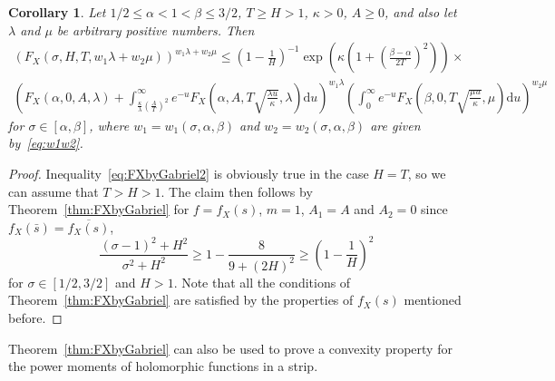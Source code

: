 \documentclass[a4paper,reqno]{amsart}
\newtheorem{corollary}{Corollary}
\theoremstyle{definition}
\newcommand{\dif}[1]{\mathrm{d}#1}
\begin{document}
\begin{corollary}
\label{cor:FXbyGabriel}
Let $1/2\leq \alpha<1<\beta\leq 3/2$, $T\geq H>1$, $\kappa>0$, $A\geq 0$, and also let $\lambda$ and $\mu$ be arbitrary positive numbers. Then
\begin{multline}
\label{eq:FXbyGabriel2}
\left(F_{X}\left(\sigma,H,T,w_{1}\lambda+w_{2}\mu\right)\right)^{w_{1}\lambda+w_{2}\mu} \leq \left(1-\frac{1}{H}\right)^{-1}\exp{\left(\kappa\left(1+\left(\frac{\beta-\alpha}{2T}\right)^{2}\right)\right)} \times \\
\left(F_{X}(\alpha,0,A,\lambda)+\int_{\frac{\kappa}{\lambda}\left(\frac{A}{T}\right)^2}^{\infty}e^{-u}F_{X}\left(\alpha,A,T\sqrt{\frac{\lambda u}{\kappa}},\lambda\right)\dif{u}\right)^{w_1\lambda}\left(\int_{0}^{\infty}e^{-u}F_{X}\left(\beta,0,T\sqrt{\frac{\mu u}{\kappa}},\mu\right)\dif{u}\right)^{w_2\mu}
\end{multline}
for $\sigma\in[\alpha,\beta]$, where $w_1=w_1(\sigma,\alpha,\beta)$ and $w_2=w_2(\sigma,\alpha,\beta)$ are given by~\eqref{eq:w1w2}.
\end{corollary}

\begin{proof}
Inequality~\eqref{eq:FXbyGabriel2} is obviously true in the case $H=T$, so we can assume that $T>H>1$. The claim then follows by Theorem~\ref{thm:FXbyGabriel} for $f=f_{X}(s)$, $m=1$, $A_1=A$ and $A_2=0$ since $f_{X}(\bar{s})=\overline{f_{X}(s)}$,
\[
\frac{(\sigma-1)^{2}+H^2}{\sigma^2+H^2}\geq 1-\frac{8}{9+(2H)^2}\geq \left(1-\frac{1}{H}\right)^{2}
\]
for $\sigma\in[1/2,3/2]$ and $H>1$. Note that all the conditions of Theorem~\ref{thm:FXbyGabriel} are satisfied by the properties of $f_{X}(s)$ mentioned before. 
\end{proof}

Theorem~\ref{thm:FXbyGabriel} can also be used to prove a convexity property for the power moments of holomorphic functions in a strip.
\end{document}

